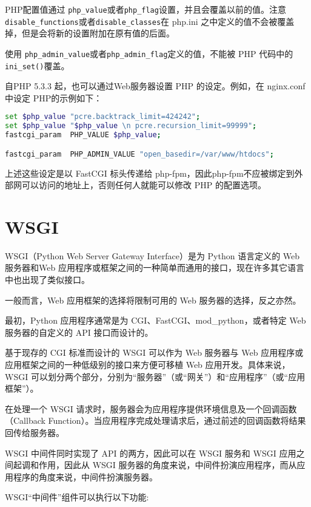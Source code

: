PHP配置值通过 \texttt{php\_value}或者\texttt{php\_flag}设置，并且会覆盖以前的值。注意\texttt{disable\_functions}或者\texttt{disable\_classes}在 php.ini 之中定义的值不会被覆盖掉，但是会将新的设置附加在原有值的后面。

使用 \texttt{php\_admin\_value}或者\texttt{php\_admin\_flag}定义的值，不能被 PHP 代码中的 \texttt{ini\_set()}覆盖。

自PHP 5.3.3 起，也可以通过Web服务器设置 PHP 的设定。例如，在 nginx.conf 中设定 PHP的示例如下：

\begin{lstlisting}[language=bash]
set $php_value "pcre.backtrack_limit=424242";
set $php_value "$php_value \n pcre.recursion_limit=99999";
fastcgi_param  PHP_VALUE $php_value;

fastcgi_param  PHP_ADMIN_VALUE "open_basedir=/var/www/htdocs";
\end{lstlisting}

上述这些设定是以 FastCGI 标头传递给 php-fpm，因此php-fpm不应被绑定到外部网可以访问的地址上，否则任何人就能可以修改 PHP 的配置选项。



\section{WSGI}

WSGI（Python Web Server Gateway Interface）是为 Python 语言定义的 Web 服务器和Web 应用程序或框架之间的一种简单而通用的接口，现在许多其它语言中也出现了类似接口。

一般而言，Web 应用框架的选择将限制可用的 Web 服务器的选择，反之亦然。

最初，Python 应用程序通常是为 CGI、FastCGI、mod\_python，或者特定 Web 服务器的自定义的 API 接口而设计的。

基于现存的 CGI 标准而设计的 WSGI 可以作为 Web 服务器与 Web 应用程序或应用框架之间的一种低级别的接口来方便可移植 Web 应用开发。具体来说，WSGI 可以划分两个部分，分别为“服务器”（或“网关”）和“应用程序”（或“应用框架”）。

在处理一个 WSGI 请求时，服务器会为应用程序提供环境信息及一个回调函数（Callback Function）。当应用程序完成处理请求后，通过前述的回调函数将结果回传给服务器。

WSGI 中间件同时实现了 API 的两方，因此可以在 WSGI 服务和 WSGI 应用之间起调和作用，因此从 WSGI 服务器的角度来说，中间件扮演应用程序，而从应用程序的角度来说，中间件扮演服务器。

WSGI“中间件”组件可以执行以下功能:

